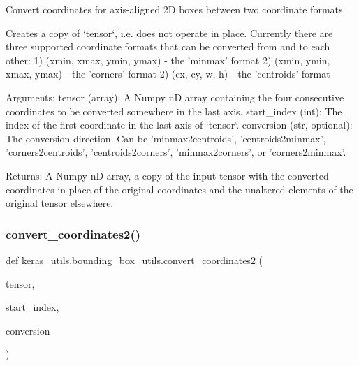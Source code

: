 \begin{DoxyVerb}Convert coordinates for axis-aligned 2D boxes between two coordinate formats.

Creates a copy of `tensor`, i.e. does not operate in place. Currently there are
three supported coordinate formats that can be converted from and to each other:
    1) (xmin, xmax, ymin, ymax) - the 'minmax' format
    2) (xmin, ymin, xmax, ymax) - the 'corners' format
    2) (cx, cy, w, h) - the 'centroids' format

Arguments:
    tensor (array): A Numpy nD array containing the four consecutive coordinates
        to be converted somewhere in the last axis.
    start_index (int): The index of the first coordinate in the last axis of `tensor`.
    conversion (str, optional): The conversion direction. Can be 'minmax2centroids',
        'centroids2minmax', 'corners2centroids', 'centroids2corners', 'minmax2corners',
        or 'corners2minmax'.

Returns:
    A Numpy nD array, a copy of the input tensor with the converted coordinates
    in place of the original coordinates and the unaltered elements of the original
    tensor elsewhere.
\end{DoxyVerb}
 \mbox{\label{namespacekeras__utils_1_1bounding__box__utils_a924087a3e5b888d700dbff75254f370b}} 
\subsubsection{\texorpdfstring{convert\+\_\+coordinates2()}{convert\_coordinates2()}}
{\footnotesize\ttfamily def keras\+\_\+utils.\+bounding\+\_\+box\+\_\+utils.\+convert\+\_\+coordinates2 (\begin{DoxyParamCaption}\item[{}]{tensor,  }\item[{}]{start\+\_\+index,  }\item[{}]{conversion }\end{DoxyParamCaption})}

